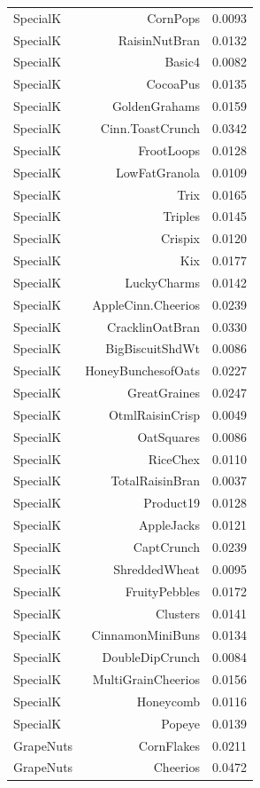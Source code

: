 \begin{longtable}{@{}lrr@{}}
SpecialK & CornPops & 0.0093 \\
SpecialK & RaisinNutBran & 0.0132 \\
SpecialK & Basic4 & 0.0082 \\
SpecialK & CocoaPus & 0.0135 \\
SpecialK & GoldenGrahams & 0.0159 \\
SpecialK & Cinn.ToastCrunch & 0.0342 \\
SpecialK & FrootLoops & 0.0128 \\
SpecialK & LowFatGranola & 0.0109 \\
SpecialK & Trix & 0.0165 \\
SpecialK & Triples & 0.0145 \\
SpecialK & Crispix & 0.0120 \\
SpecialK & Kix & 0.0177 \\
SpecialK & LuckyCharms & 0.0142 \\
SpecialK & AppleCinn.Cheerios & 0.0239 \\
SpecialK & CracklinOatBran & 0.0330 \\
SpecialK & BigBiscuitShdWt & 0.0086 \\
SpecialK & HoneyBunchesofOats & 0.0227 \\
SpecialK & GreatGraines & 0.0247 \\
SpecialK & OtmlRaisinCrisp & 0.0049 \\
SpecialK & OatSquares & 0.0086 \\
SpecialK & RiceChex & 0.0110 \\
SpecialK & TotalRaisinBran & 0.0037 \\
SpecialK & Product19 & 0.0128 \\
SpecialK & AppleJacks & 0.0121 \\
SpecialK & CaptCrunch & 0.0239 \\
SpecialK & ShreddedWheat & 0.0095 \\
SpecialK & FruityPebbles & 0.0172 \\
SpecialK & Clusters & 0.0141 \\
SpecialK & CinnamonMiniBuns & 0.0134 \\
SpecialK & DoubleDipCrunch & 0.0084 \\
SpecialK & MultiGrainCheerios & 0.0156 \\
SpecialK & Honeycomb & 0.0116 \\
SpecialK & Popeye & 0.0139 \\
GrapeNuts & CornFlakes & 0.0211 \\
GrapeNuts & Cheerios & 0.0472 \\

\end{longtable}
